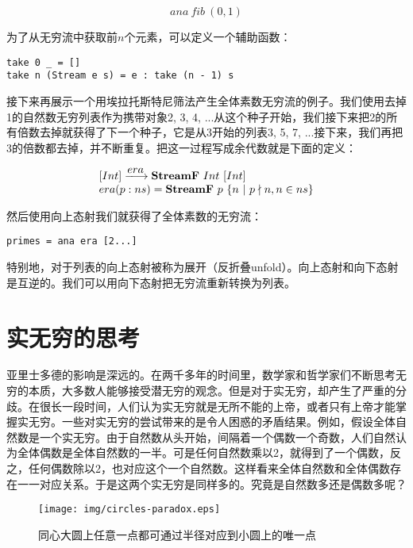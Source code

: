 \documentclass{article}
\begin{document}
\[
ana\ fib\ (0, 1)
\]

为了从无穷流中获取前$n$个元素，可以定义一个辅助函数：

\begin{lstlisting}
take 0 _ = []
take n (Stream e s) = e : take (n - 1) s
\end{lstlisting}

接下来再展示一个用埃拉托斯特尼筛法产生全体素数无穷流的例子。我们使用去掉1的自然数无穷列表作为携带对象2, 3, 4, ...从这个种子开始，我们接下来把2的所有倍数去掉就获得了下一个种子，它是从3开始的列表3, 5, 7, ...接下来，我们再把3的倍数都去掉，并不断重复。把这一过程写成余代数就是下面的定义：

\[
\begin{array}{l}
[Int] \arrowto{era} \mathbf{StreamF}\ Int\ [Int] \\
era (p:ns) = \mathbf{StreamF}\ p\ \{ n\ |\ p \nmid n, n \in ns\} \\
\end{array}
\]

然后使用向上态射我们就获得了全体素数的无穷流：

\begin{lstlisting}
primes = ana era [2...]
\end{lstlisting}

特别地，对于列表的向上态射被称为展开（反折叠unfold）。向上态射和向下态射是互逆的。我们可以用向下态射把无穷流重新转换为列表。

\begin{Exercise}
\end{Exercise}

\section{实无穷的思考}
亚里士多德的影响是深远的。在两千多年的时间里，数学家和哲学家们不断思考无穷的本质，大多数人能够接受潜无穷的观念。但是对于实无穷，却产生了严重的分歧。在很长一段时间，人们认为实无穷就是无所不能的上帝，或者只有上帝才能掌握实无穷。一些对实无穷的尝试带来的是令人困惑的矛盾结果。例如，假设全体自然数是一个实无穷。由于自然数从头开始，间隔着一个偶数一个奇数，人们自然认为全体偶数是全体自然数的一半。可是任何自然数乘以2，就得到了一个偶数，反之，任何偶数除以2，也对应这个一个自然数。这样看来全体自然数和全体偶数存在一一对应关系。于是这两个实无穷是同样多的。究竟是自然数多还是偶数多呢？

\begin{wrapfigure}{L}{0.4\textwidth}
 \centering
 \texttt{[image: img/circles-paradox.eps]}
 \caption{同心大圆上任意一点都可通过半径对应到小圆上的唯一点}
 \label{fig:circles-paradox}
\end{wrapfigure}
\end{document}
